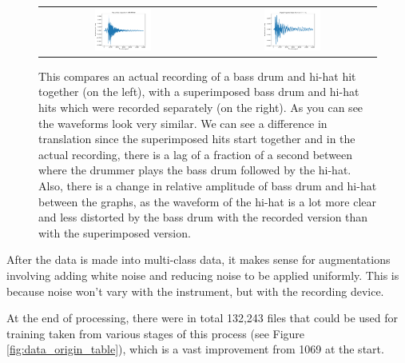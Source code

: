 \documentclass[12pt]{article}
\begin{document}
    \begin{figure}[H]
        \centering
        \begin{tabular}{cc}
            \includegraphics[width=0.35\textwidth]{figures/recorded_bd_hh.pdf}&
            \includegraphics[width=0.35\textwidth]{figures/superimposed_bd_hh.pdf}\\
        \end{tabular}
        \caption{\footnotesize{This compares an actual recording of a bass drum and hi-hat hit together (on the left), with a superimposed bass drum and hi-hat hits which were recorded separately (on the right). As you can see the waveforms look very similar. We can see a difference in translation since the superimposed hits start together and in the actual recording, there is a lag of a fraction of a second between where the drummer plays the bass drum followed by the hi-hat. Also, there is a change in relative amplitude of bass drum and hi-hat between the graphs, as the waveform of the hi-hat is a lot more clear and less distorted by the bass drum with the recorded version than with the superimposed version.}}
        \label{fig:synthetic_vs_real}
    \end{figure}
    
    After the data is made into multi-class data, it makes sense for augmentations involving adding white noise and reducing noise to be applied uniformly. This is because noise won't vary with the instrument, but with the recording device.\medskip
    
    At the end of processing, there were in total 132,243 files that could be used for training taken from various stages of this process (see Figure \ref{fig:data_origin_table}), which is a vast improvement from 1069 at the start.\medskip
    
\end{document}

